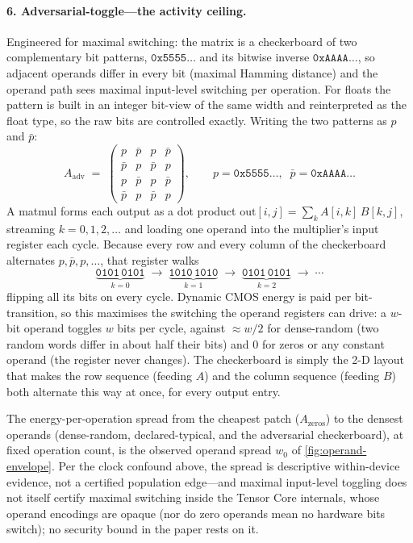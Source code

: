 \documentclass{article}
\theoremstyle{plain}
\theoremstyle{definition}
\theoremstyle{remark}
\begin{document}
\paragraph{6. Adversarial-toggle---the activity ceiling.}
Engineered for maximal switching: the matrix is a checkerboard of two
complementary bit patterns, $\texttt{0x5555}\ldots$ and its bitwise
inverse $\texttt{0xAAAA}\ldots$, so adjacent operands differ in every
bit (maximal Hamming distance) and the operand path sees maximal
input-level switching per operation. For floats the pattern is built in an
integer bit-view of the same width and reinterpreted as the float type, so
the raw bits are controlled exactly. Writing the
two patterns as $p$ and $\bar p$:
\begin{equation*}
	A_{\mathrm{adv}} \;=\;
	\begin{pmatrix}
		p & \bar p & p & \bar p \\
		\bar p & p & \bar p & p \\
		p & \bar p & p & \bar p \\
		\bar p & p & \bar p & p
	\end{pmatrix},
	\qquad
	p = \texttt{0x5555}\ldots,\;\; \bar p = \texttt{0xAAAA}\ldots
\end{equation*}
A matmul forms each output as a dot product
$\text{out}[i,j]=\sum_k A[i,k]\,B[k,j]$, streaming $k=0,1,2,\ldots$ and
loading one operand into the multiplier's input register each cycle.
Because every row and every column of the checkerboard alternates
$p,\bar p,p,\ldots$, that register walks
\begin{equation*}
	\underbrace{\mathtt{0101\,0101}}_{k=0}\;\to\;\underbrace{\mathtt{1010\,1010}}_{k=1}\;\to\;
	\underbrace{\mathtt{0101\,0101}}_{k=2}\;\to\;\cdots
\end{equation*}
flipping all its bits on every cycle. Dynamic CMOS energy is
paid per bit-transition, so this maximises the switching the operand
registers can drive: a $w$-bit operand toggles $w$ bits per cycle, against ${\approx}w/2$
for dense-random (two random words differ in about half their bits) and $0$
for zeros or any constant operand (the register never changes). The
checkerboard is simply the 2-D layout that makes the row sequence (feeding
$A$) and the column sequence (feeding $B$) both alternate this way at once,
for every output entry.

The energy-per-operation spread from the cheapest patch ($A_{\mathrm{zeros}}$)
to the densest operands (dense-random, declared-typical, and the adversarial
checkerboard), at fixed operation count, is the observed operand spread
$w_0$ of \cref{fig:operand-envelope}. Per
the clock confound above, the spread is
descriptive within-device evidence, not a certified population edge---and
maximal input-level toggling does not itself certify maximal switching
inside the Tensor Core internals, whose operand encodings are opaque (nor
do zero operands mean no hardware bits switch); no security bound in the
paper rests on it.
\end{document}
